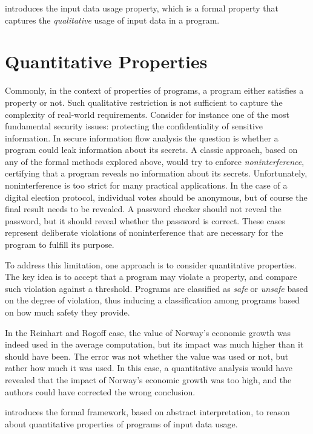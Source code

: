  introduces the input data usage property, which is a formal property that captures the \emph{qualitative} usage of input data in a program.

\section{Quantitative Properties}

Commonly, in the context of properties of programs, a program either satisfies a property or not.
Such qualitative restriction is not sufficient to capture the complexity of real-world requirements.
Consider for instance one of the most fundamental security issues: protecting the confidentiality of sensitive information.
In secure information flow analysis the question is whether a program could leak information about its secrets.
A classic approach, based on any of the formal methods explored above, would try to enforce \emph{noninterference}, certifying that a program reveals no information about its secrets.
Unfortunately, noninterference is too strict for many practical applications.
In the case of a digital election protocol, individual votes should be anonymous, but of course the final result needs to be revealed. A password checker should not reveal the password, but it should reveal whether the password is correct.
These cases represent deliberate violations of noninterference that are necessary for the program to fulfill its purpose.

To address this limitation, one approach is to consider quantitative properties.
The key idea is to accept that a program may violate a property, and compare such violation against a threshold.
Programs are classified as \emph{safe} or \emph{unsafe} based on the degree of violation, thus inducing a classification among programs based on how much safety they provide.


In the Reinhart and Rogoff case, the value of Norway's economic growth was indeed used in the average computation, but its impact was much higher than it should have been.
The error was not whether the value was used or not, but rather how much it was used.
In this case, a quantitative analysis would have revealed that the impact of Norway's economic growth was too high, and the authors could have corrected the wrong conclusion.

 introduces the formal framework, based on abstract interpretation, to reason about quantitative properties of programs of input data usage.


